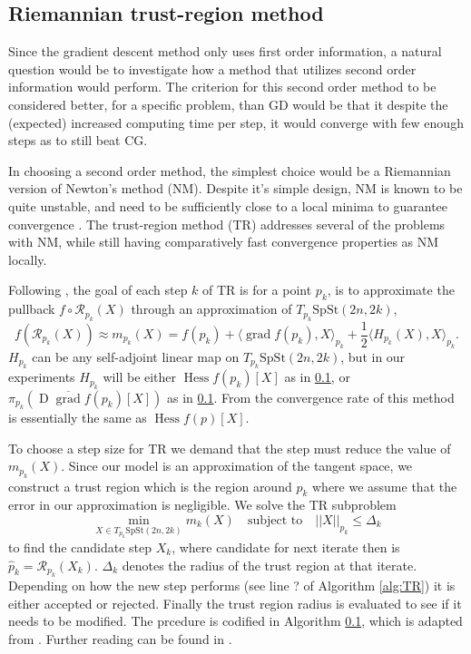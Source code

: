 \subsection{Riemannian trust-region method}
Since the gradient descent method only uses first order information, a natural question would be to investigate how a method that utilizes second order information would perform. The criterion for this second order method to be considered better, for a specific problem, than GD would be that it despite the (expected) increased computing time per step, it would converge with few enough steps as to still beat CG. 

In choosing a second order method, the simplest choice would be a Riemannian version of Newton's method (NM). Despite it's simple design, NM is known to be quite unstable, and need to be sufficiently close to a local minima to guarantee convergence \cite[p.~122]{Boumal2023}. The trust-region method (TR) addresses several of the problems with NM, while still having comparatively fast convergence properties as NM locally. 

Following \cite[p.~131]{Boumal2023}, the goal of each step $k$ of TR is for a point $p_{k}$, is to approximate the pullback $f\circ \mathcal{R}_{p_{k}}(X)$ through an approximation of $T_{p_{k}}\mathrm{SpSt}(2n, 2k)$,
%
\begin{equation*}
f(\mathcal{R}_{p_{k}}(X))\approx m_{p_{k}}(X)=f(p_{k})+\langle \operatorname{grad}f(p_{k}),X \rangle _{p_{k}}+ \frac{1}{2}\langle H_{p_{k}}(X),X \rangle _{p_{k}}.
\end{equation*}
%
$H_{p_{k}}$ can be any self-adjoint linear map on $T_{p_{k}}\mathrm{SpSt}(2n, 2k)$, but in our experiments $H_{p_{k}}$ will be either $\operatorname{Hess}f(p_{k})[X]$ as in \ref{}, or $\pi_{p_{k}}(\operatorname{D}\overline{\operatorname{grad}}f(p_{k})[X])$ as in \ref{}. From \cite[Prop.~5.44]{Boumal2023} the convergence rate of this method is essentially the same as $\operatorname{Hess}f(p)[X]$. 

To choose a step size for TR we demand that the step must reduce the value of $m_{p_{k}}(X)$. Since our model is an approximation of the tangent space, we construct a trust region which is the region around $p_{k}$ where we assume that the error in our approximation is negligible. We solve the TR subproblem
%
\begin{equation}\label{eq:TR_subproblem}
\operatorname*{min}_{X\in T_{p_{k}}\mathrm{SpSt}(2n, 2k)}m_{k}(X)\quad \text{subject to}\quad \lvert \lvert X \rvert  \rvert _{p_{k}}\leq \Delta_{k}
\end{equation}
%
to find the candidate step $X_{k}$,  where candidate for next iterate then is $\hat{p}_{k}=\mathcal{R}_{p_{k}}(X_{k})$. $\Delta_{k}$ denotes the radius of the trust region at that iterate. Depending on how the new step performs (see line ? of Algorithm \ref{alg:TR}) it is either accepted or rejected. Finally the trust region radius is evaluated to see if it needs to be modified. The prcedure is codified in Algorithm \ref{}, which is adapted from \cite[Algorithm 3.3]{Boumal2023}. Further reading can be found in \cite[p.~131]{Boumal2023}.

